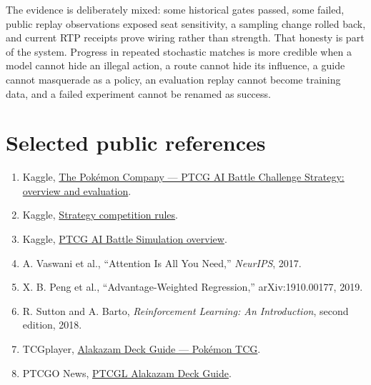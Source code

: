 \documentclass[10pt]{article}
\begin{document}
The evidence is deliberately mixed: some historical gates passed, some failed, public replay observations exposed seat sensitivity, a sampling change rolled back, and current RTP receipts prove wiring rather than strength. That honesty is part of the system. Progress in repeated stochastic matches is more credible when a model cannot hide an illegal action, a route cannot hide its influence, a guide cannot masquerade as a policy, an evaluation replay cannot become training data, and a failed experiment cannot be renamed as success.

\section*{Selected public references}

\footnotesize
\begin{enumerate}[itemsep=0pt,topsep=0.15em]
\item Kaggle, \href{https://www.kaggle.com/competitions/pokemon-tcg-ai-battle-challenge-strategy/overview}{The Pok\'emon Company --- PTCG AI Battle Challenge Strategy: overview and evaluation}.
\item Kaggle, \href{https://www.kaggle.com/competitions/pokemon-tcg-ai-battle-challenge-strategy/rules}{Strategy competition rules}.
\item Kaggle, \href{https://www.kaggle.com/competitions/pokemon-tcg-ai-battle/overview/description}{PTCG AI Battle Simulation overview}.
\item A. Vaswani et al., ``Attention Is All You Need,'' \emph{NeurIPS}, 2017.
\item X. B. Peng et al., ``Advantage-Weighted Regression,'' arXiv:1910.00177, 2019.
\item R. Sutton and A. Barto, \emph{Reinforcement Learning: An Introduction}, second edition, 2018.
\item TCGplayer, \href{https://www.tcgplayer.com/content/article/Alakazam-Deck-Guide-Pok%C3%A9mon-TCG/7eb46b82-9dc5-40d8-adf9-28cca05f070f/}{Alakazam Deck Guide --- Pok\'emon TCG}.
\item PTCGO News, \href{https://ptcgonews.com/tips/ptcgl-alakazam-deck-guide/}{PTCGL Alakazam Deck Guide}.
\end{enumerate}
\end{document}
